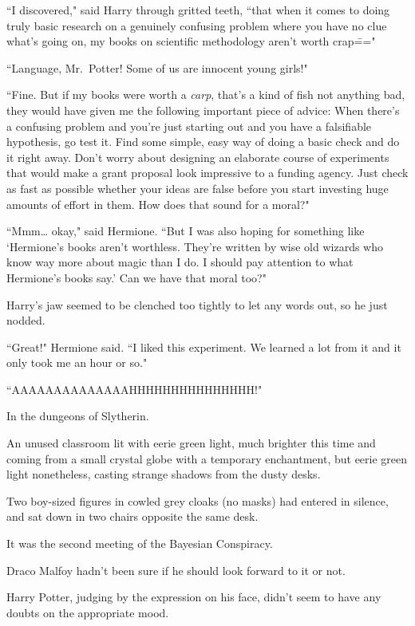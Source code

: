 ``I discovered," said Harry through gritted teeth, ``that when it comes to doing truly basic research on a genuinely confusing problem where you have no clue what's going on, my books on scientific methodology aren't worth crap\==="

``Language, Mr.~Potter! Some of us are innocent young girls!"

``Fine. But if my books were worth a \emph{carp}, that's a kind of fish not anything bad, they would have given me the following important piece of advice: When there's a confusing problem and you're just starting out and you have a falsifiable hypothesis, go test it. Find some simple, easy way of doing a basic check and do it right away. Don't worry about designing an elaborate course of experiments that would make a grant proposal look impressive to a funding agency. Just check as fast as possible whether your ideas are false before you start investing huge amounts of effort in them. How does that sound for a moral?"

``Mmm{\ldots} okay," said Hermione. ``But I was also hoping for something like `Hermione's books aren't worthless. They're written by wise old wizards who know way more about magic than I do. I should pay attention to what Hermione's books say.' Can we have that moral too?"

Harry's jaw seemed to be clenched too tightly to let any words out, so he just nodded.

``Great!" Hermione said. ``I liked this experiment. We learned a lot from it and it only took me an hour or so."

``AAAAAAAAAAAAAAHHHHHHHHHHHHHHH!"

\later

In the dungeons of Slytherin.

An unused classroom lit with eerie green light, much brighter this time and coming from a small crystal globe with a temporary enchantment, but eerie green light nonetheless, casting strange shadows from the dusty desks.

Two boy-sized figures in cowled grey cloaks (no masks) had entered in silence, and sat down in two chairs opposite the same desk.

It was the second meeting of the Bayesian Conspiracy.

Draco Malfoy hadn't been sure if he should look forward to it or not.

Harry Potter, judging by the expression on his face, didn't seem to have any doubts on the appropriate mood.

